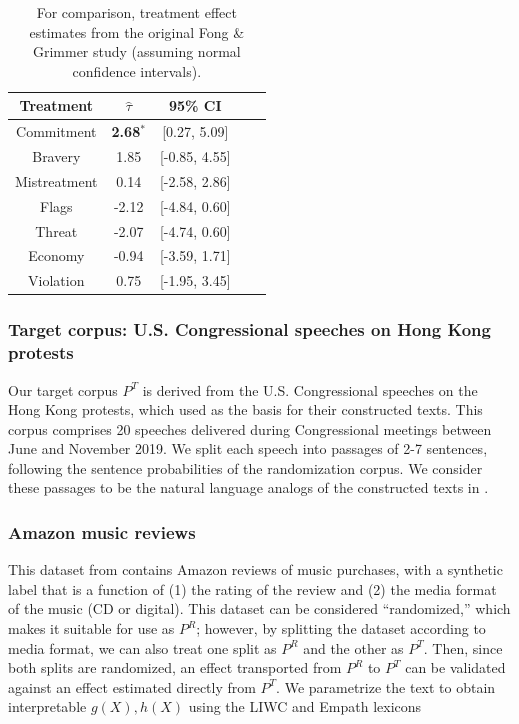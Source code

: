 \documentclass{article}
\begin{document}
\begin{table}[!ht]
    \centering
    \begin{tabular}{c|cccc}
        \toprule
        Treatment & $\hat{\tau}$ & 95\% CI \\
        \midrule
        Commitment & \textbf{\textcolor{green!50!black}{2.68$^*$}} & [0.27, 5.09] \\
        Bravery & \textcolor{green!50!black}{1.85} & [-0.85, 4.55] \\
        Mistreatment & \textcolor{green!50!black}{0.14} & [-2.58, 2.86] \\
        Flags & \textcolor{red!80!black}{-2.12} & [-4.84, 0.60] \\
        Threat & \textcolor{red!80!black}{-2.07} & [-4.74, 0.60]  \\
        Economy & \textcolor{red!80!black}{-0.94} & [-3.59, 1.71] \\
        Violation & \textcolor{green!50!black}{0.75} & [-1.95, 3.45] \\
        \bottomrule
    \end{tabular}
    \caption{For comparison, treatment effect estimates from the original Fong \& Grimmer study \cite{fong2021causal} (assuming normal confidence intervals).}
    \label{tab:results_baseline}
\end{table}

\subsubsection{Target corpus: U.S. Congressional speeches on Hong Kong protests}

Our target corpus $P^T$ is derived from the U.S. Congressional speeches on the Hong Kong protests, which \cite{fong2021causal} used as the basis for their constructed texts. This corpus comprises 20 speeches delivered during Congressional meetings between June and November 2019. We split each speech into passages of 2-7 sentences, following the sentence probabilities of the randomization corpus. We consider these passages to be the natural language analogs of the constructed texts in \cite{fong2021causal}.

\subsubsection{Amazon music reviews}

This dataset from \cite{przyant2021causal} contains Amazon reviews of music purchases, with a synthetic label that is a function of (1) the rating of the review and (2) the media format of the music (CD or digital). This dataset can be considered ``randomized,'' which makes it suitable for use as $P^R$; however, by splitting the dataset according to media format, we can also treat one split as $P^R$ and the other as $P^T$. Then, since both splits are randomized, an effect transported from $P^R$ to $P^T$ can be validated against an effect estimated directly from $P^T$. We parametrize the text to obtain interpretable $g(X), h(X)$ using the LIWC and Empath lexicons
\end{document}
